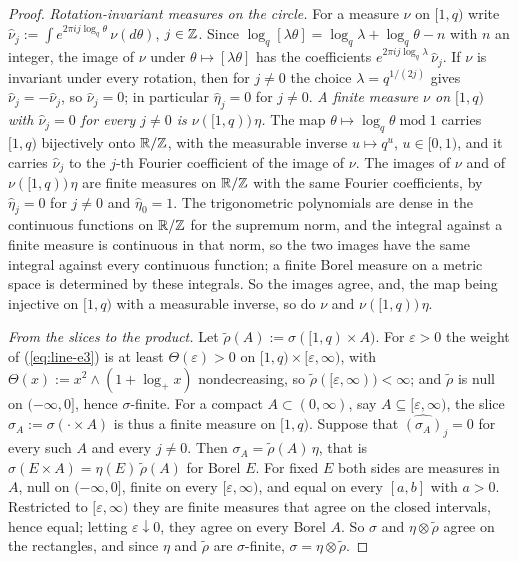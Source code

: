 \begin{proof}
\emph{Rotation-invariant measures on the circle.} For a measure $\nu$ on $[1,q)$ write
$\widehat\nu_j := \int e^{2\pi ij\log_q\theta}\,\nu(d\theta)$, $j \in \mathbb{Z}$. Since
$\log_q[\lambda\theta] = \log_q\lambda + \log_q\theta - n$ with $n$ an integer, the image of $\nu$
under $\theta \mapsto [\lambda\theta]$ has the coefficients
$e^{2\pi ij\log_q\lambda}\,\widehat\nu_j$. If $\nu$ is invariant under every rotation, then for
$j \ne 0$ the choice $\lambda = q^{1/(2j)}$ gives $\widehat\nu_j = -\widehat\nu_j$, so
$\widehat\nu_j = 0$; in particular $\widehat\eta_j = 0$ for $j \ne 0$. \emph{A finite measure $\nu$
on $[1,q)$ with $\widehat\nu_j = 0$ for every $j \ne 0$ is $\nu([1,q))\,\eta$.} The map
$\theta \mapsto \log_q\theta \operatorname{mod} 1$ carries $[1,q)$ bijectively onto $\mathbb{R}/\mathbb{Z}$,
with the measurable inverse $u \mapsto q^u$, $u \in [0,1)$, and it carries $\widehat\nu_j$ to the $j$-th
Fourier coefficient of the image of $\nu$. The images of $\nu$ and of $\nu([1,q))\,\eta$ are finite
measures on $\mathbb{R}/\mathbb{Z}$ with the same Fourier coefficients, by $\widehat\eta_j = 0$ for $j \ne 0$
and $\widehat\eta_0 = 1$. The trigonometric polynomials are dense in the continuous functions on
$\mathbb{R}/\mathbb{Z}$ for the supremum norm, and the integral against a finite measure is continuous in that
norm, so the two images have the same integral against every continuous function; a finite Borel
measure on a metric space is determined by these integrals. So the images agree, and, the map being
injective on $[1,q)$ with a measurable inverse, so do $\nu$ and $\nu([1,q))\,\eta$.

\emph{From the slices to the product.} Let $\tilde\rho(A) := \sigma([1,q) \times A)$. For
$\varepsilon > 0$ the weight of (\ref{eq:line-e3}) is at least $\Theta(\varepsilon) > 0$ on
$[1,q) \times [\varepsilon,\infty)$, with $\Theta(x) := x^2 \wedge (1 + \log_+x)$ nondecreasing, so
$\tilde\rho([\varepsilon,\infty)) < \infty$; and $\tilde\rho$ is null on $(-\infty,0]$, hence
$\sigma$-finite. For a compact $A \subset (0,\infty)$, say $A \subseteq [\varepsilon,\infty)$,
the slice $\sigma_A := \sigma(\cdot \times A)$ is thus a finite measure on $[1,q)$. Suppose that
$\widehat{(\sigma_A)}_j = 0$ for every such $A$ and every $j \ne 0$. Then
$\sigma_A = \tilde\rho(A)\,\eta$, that is $\sigma(E \times A) = \eta(E)\,\tilde\rho(A)$ for Borel
$E$. For fixed $E$ both sides are measures in $A$, null on $(-\infty,0]$, finite on every
$[\varepsilon,\infty)$, and equal on every $[a,b]$ with $a > 0$. Restricted to $[\varepsilon,\infty)$
they are finite measures that agree on the closed intervals, hence equal; letting
$\varepsilon \downarrow 0$, they agree on every Borel $A$. So $\sigma$ and $\eta \otimes \tilde\rho$
agree on the rectangles, and since $\eta$ and $\tilde\rho$ are $\sigma$-finite,
$\sigma = \eta \otimes \tilde\rho$.


\end{proof}

